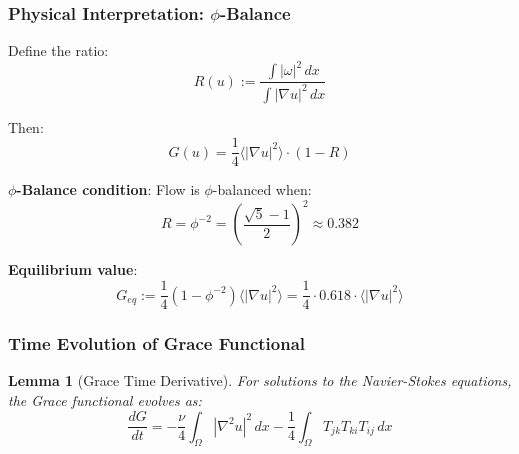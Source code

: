 \documentclass[12pt,a4paper]{article}
\newtheorem{lemma}[theorem]{Lemma}
\begin{document}
\subsubsection{Physical Interpretation: $\phi$-Balance}

Define the ratio:
\begin{equation}
R(u) := \frac{\int |\omega|^2\, dx}{\int |\nabla u|^2\, dx}
\end{equation}

Then:
\begin{equation}
G(u) = \frac{1}{4}\langle |\nabla u|^2 \rangle \cdot (1 - R)
\end{equation}

\textbf{$\phi$-Balance condition}: Flow is $\phi$-balanced when:
\begin{equation}
R = \phi^{-2} = \left(\frac{\sqrt{5}-1}{2}\right)^2 \approx 0.382
\end{equation}

\textbf{Equilibrium value}:
\begin{equation}
G_{eq} := \frac{1}{4}(1 - \phi^{-2})\langle |\nabla u|^2 \rangle = \frac{1}{4} \cdot 0.618 \cdot \langle |\nabla u|^2 \rangle
\end{equation}

\subsubsection{Time Evolution of Grace Functional}

\begin{lemma}[Grace Time Derivative]
For solutions to the Navier-Stokes equations, the Grace functional evolves as:
\begin{equation}
\frac{dG}{dt} = -\frac{\nu}{4} \int_\Omega |\nabla^2 u|^2\, dx - \frac{1}{4} \int_\Omega T_{jk} T_{ki} T_{ij}\, dx
\end{equation}
\end{lemma}
\end{document}
